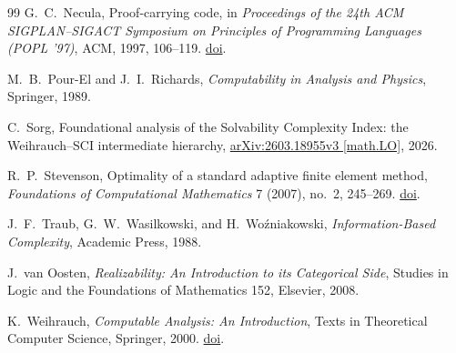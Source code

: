 \documentclass[11pt]{article}
\theoremstyle{definition}
\begin{document}
\begin{thebibliography}{99}
G.~C.~Necula,
Proof-carrying code,
in \emph{Proceedings of the 24th ACM SIGPLAN--SIGACT Symposium on Principles of Programming Languages (POPL '97)},
ACM, 1997, 106--119.
\href{https://doi.org/10.1145/263699.263712}{doi}.

M.~B.~Pour-El and J.~I.~Richards,
\emph{Computability in Analysis and Physics}, Springer, 1989.

C.~Sorg,
Foundational analysis of the Solvability Complexity Index: the Weihrauch--SCI intermediate
hierarchy,
\href{https://arxiv.org/abs/2603.18955v3}{arXiv:2603.18955v3 [math.LO]}, 2026.

R.~P.~Stevenson,
Optimality of a standard adaptive finite element method,
\emph{Foundations of Computational Mathematics} 7 (2007), no.~2, 245--269.
\href{https://doi.org/10.1007/s10208-005-0183-0}{doi}.

J.~F.~Traub, G.~W.~Wasilkowski, and H.~Wo\'zniakowski,
\emph{Information-Based Complexity}, Academic Press, 1988.

J.~van Oosten,
\emph{Realizability: An Introduction to its Categorical Side},
Studies in Logic and the Foundations of Mathematics 152, Elsevier, 2008.

K.~Weihrauch,
\emph{Computable Analysis: An Introduction},
Texts in Theoretical Computer Science, Springer, 2000.
\href{https://doi.org/10.1007/978-3-642-56999-9}{doi}.

\end{thebibliography}
\end{document}

